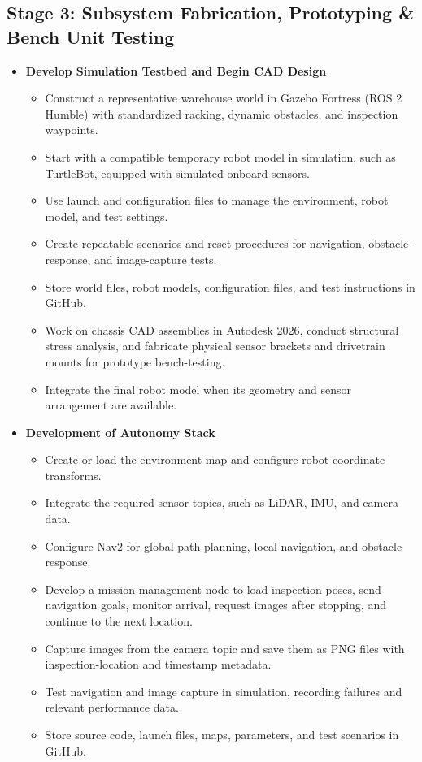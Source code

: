 \documentclass{article}
\begin{document}
\subsection{Stage 3: Subsystem Fabrication, Prototyping \& Bench Unit Testing}
\begin{itemize}
	\item \textbf{Develop Simulation Testbed and Begin CAD Design}
	\begin{itemize}
		\item Construct a representative warehouse world in Gazebo Fortress (ROS 2 Humble) with standardized racking, dynamic obstacles, and inspection waypoints.
		\item Start with a compatible temporary robot model in simulation, such as TurtleBot, equipped with simulated onboard sensors.
		\item Use launch and configuration files to manage the environment, robot model, and test settings.
		\item Create repeatable scenarios and reset procedures for navigation, obstacle-response, and image-capture tests.
		\item Store world files, robot models, configuration files, and test instructions in GitHub.
		\item Work on chassis CAD assemblies in Autodesk 2026, conduct structural stress analysis, and fabricate physical sensor brackets and drivetrain mounts for prototype bench-testing.
		\item Integrate the final robot model when its geometry and sensor arrangement are available.
	\end{itemize}
	
	\item \textbf{Development of Autonomy Stack}
	\begin{itemize}
		\item Create or load the environment map and configure robot coordinate transforms.
		\item Integrate the required sensor topics, such as LiDAR, IMU, and camera data.
		\item Configure Nav2 for global path planning, local navigation, and obstacle response.
		\item Develop a mission-management node to load inspection poses, send navigation goals, monitor arrival, request images after stopping, and continue to the next location.
		\item Capture images from the camera topic and save them as PNG files with inspection-location and timestamp metadata.
		\item Test navigation and image capture in simulation, recording failures and relevant performance data.
		\item Store source code, launch files, maps, parameters, and test scenarios in GitHub.
	\end{itemize}
	

\end{itemize}
\end{document}
